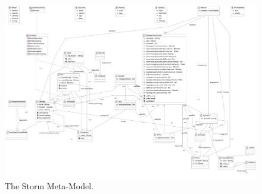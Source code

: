 \begin{figure}
	\begin{center}
		\includegraphics[width=18cm]{images/Stormmm}
		\caption{The Storm Meta-Model.}
		\label{stormmm}
	\end{center}
\end{figure}
%

